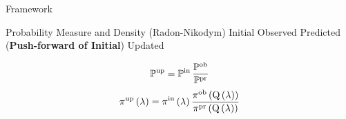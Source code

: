 \begin{block}{Framework}
\large
    \begin{itemize}
        \itembox{$ \PP, \pi $} Probability Measure and Density (Radon-Nikodym)
        \itembox{$ \initialP, \; \initial $} Initial
        \itembox{$ \observedP, \; \observed $} Observed
        \itembox{$ \predictedP, \; \predicted $} Predicted ({\bf Push-forward of Initial})
        \itembox{$ \updatedP, \; \updated $} Updated
    \end{itemize}

\Large
    \begin{equation*}
            \dciP 
    \end{equation*}
    \begin{equation*}
            \dci
    \end{equation*}

\end{block}
\vspace{-1cm}
